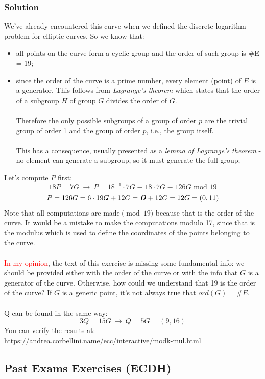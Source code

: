 \documentclass[11pt, a4paper]{article}
\newcommand{\mymod}{
    \text{ mod }
}
\begin{document}
\subsubsection*{Solution}
We've already encountered this curve when we defined the discrete logarithm problem for elliptic curves. So we know that:
\begin{itemize}
    \item all points on the curve form a cyclic group and the order of such group is \#E = 19;
    \item since the order of the curve is a prime number, every element (point) of $E$ is a generator. This follows from \textit{Lagrange's theorem} which states that the order of a subgroup $H$ of group $G$ divides the order of $G$.\\\\
    Therefore the only possible subgroups of a group of order $p$ are the trivial group of order 1 and the group of order $p$, i.e., the group itself.\\\\
    This has a consequence, usually presented as a \textit{lemma of Lagrange's theorem} - no element can generate a subgroup, so it must generate the full group;
\end{itemize}
Let's compute $P$ first:
$$18P=7G\ \longrightarrow\ P=18^{-1}\cdot7G\equiv18\cdot7G\equiv126G\mymod19$$
$$P=126G=6\cdot19G+12G=\text{\textbf{\textit{O}}}+12G=12G=(0,11)$$
Note that all computations are made$\pmod{19}$ because that is the order of the curve. It would be a mistake to make the computations modulo 17, since that is the modulus which is used to define the coordinates of the points belonging to the curve.\\\\
\textcolor{red}{In my opinion}, the text of this exercise is missing some fundamental info: we should be provided either with the order of the curve or with the info that $G$ is a generator of the curve. Otherwise, how could we understand that 19 is the order of the curve? If $G$ is a generic point, it's not always true that $ord(G)=\#E$.\\\\
Q can be found in the same way:
$$3Q=15G\ \longrightarrow\ Q=5G=(9,16)$$
You can verify the results at: \textcolor{blue}{\url{https://andrea.corbellini.name/ecc/interactive/modk-mul.html}}

\newpage
\subsection{Past Exams Exercises (ECDH)}
\end{document}
